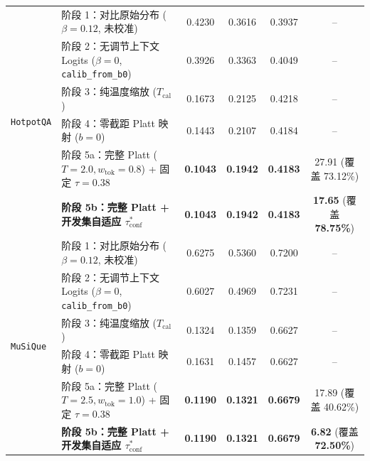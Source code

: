 \documentclass[11pt]{article}
\begin{document}
\begin{table}[t]
{\begin{tabular}{llcccc}
\midrule
\multirow{6}{*}{\texttt{HotpotQA}}
& 阶段 1：对比原始分布 ($\beta=0.12$, 未校准) & 0.4230 & 0.3616 & 0.3937 & -- \\
& 阶段 2：无调节上下文 Logits ($\beta=0$, \texttt{calib\_from\_b0}) & 0.3926 & 0.3363 & 0.4049 & -- \\
& 阶段 3：纯温度缩放 ($T_{\text{cal}}$) & 0.1673 & 0.2125 & 0.4218 & -- \\
& 阶段 4：零截距 Platt 映射 ($b=0$) & 0.1443 & 0.2107 & 0.4184 & -- \\
& 阶段 5a：完整 Platt ($T=2.0, w_{\text{tok}}=0.8$) + 固定 $\tau=0.38$ & \textbf{0.1043} & \textbf{0.1942} & \textbf{0.4183} & 27.91 (覆盖 73.12\%) \\
& \textbf{阶段 5b：完整 Platt + 开发集自适应 $\tau_{\text{conf}}^*$} & \textbf{0.1043} & \textbf{0.1942} & \textbf{0.4183} & \textbf{17.65} (覆盖 \textbf{78.75\%}) \\
\midrule
\multirow{6}{*}{\texttt{MuSiQue}}
& 阶段 1：对比原始分布 ($\beta=0.12$, 未校准) & 0.6275 & 0.5360 & 0.7200 & -- \\
& 阶段 2：无调节上下文 Logits ($\beta=0$, \texttt{calib\_from\_b0}) & 0.6027 & 0.4969 & 0.7231 & -- \\
& 阶段 3：纯温度缩放 ($T_{\text{cal}}$) & 0.1324 & 0.1359 & 0.6627 & -- \\
& 阶段 4：零截距 Platt 映射 ($b=0$) & 0.1631 & 0.1457 & 0.6627 & -- \\
& 阶段 5a：完整 Platt ($T=2.5, w_{\text{tok}}=1.0$) + 固定 $\tau=0.38$ & \textbf{0.1190} & \textbf{0.1321} & \textbf{0.6679} & 17.89 (覆盖 40.62\%) \\
& \textbf{阶段 5b：完整 Platt + 开发集自适应 $\tau_{\text{conf}}^*$} & \textbf{0.1190} & \textbf{0.1321} & \textbf{0.6679} & \textbf{6.82} (覆盖 \textbf{72.50\%}) \\
\bottomrule
\end{tabular}
}
\end{table}
\end{document}
